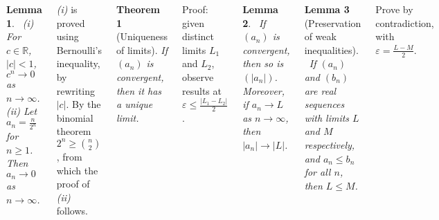 \documentclass{tikzposter} %
\newtheorem{theorem}{Theorem}
\newtheorem{lemma}{Lemma}
\begin{document}
\begin{columns}
{{    \begin{lemma}
    \ (i) For $c \in \mathbb{R}$, $|c| < 1$, $c^{n} \to 0$ as $n \to \infty$. \\
      (ii) Let $a_{n} = \frac{n}{2^{n}}$ for $n \ge 1$. Then $a_{n} \to 0$ as $n \to \infty$. \\
    \end{lemma}
    \emph{(i)} is proved using Bernoulli's inequality, by rewriting $|c|$. By the binomial theorem $2^{n} \ge {n \choose 2}$, from which the proof of \emph{(ii)} follows.\\
    \begin{theorem}[Uniqueness of limits]
      If $(a_{n})$ is convergent, then it has a unique limit.\\
    \end{theorem}
    Proof: given distinct limits $L_{1}$ and $L_{2}$, observe results at $\varepsilon \le \frac{|L_{1}-L_{2}|}{2}$.\\

    \begin{lemma}
    \ If $(a_{n})$ is convergent, then so is $(|a_{n}|)$. Moreover, if $a_{n} \to L$ as $n \to \infty$, then $|a_{n}| \to |L|$.\\
    \end{lemma}

    \begin{lemma}[Preservation of weak inequalities]
    \  If $(a_{n})$ and $(b_{n})$ are real sequences with limits $L$ and $M$ respectively, and $a_{n} \le b_{n}$ for all $n$, then $L \le M$.\\
    \end{lemma}
    Prove by contradiction, with $\varepsilon = \frac{L-M}{2}$. \\

}}
\end{columns}
\end{document}

